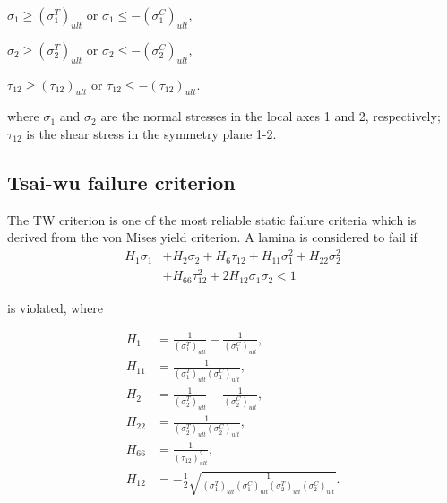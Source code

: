 $\sigma_1 \geq (\sigma _1^{T})_{ult} $ or $\sigma_1 \leq -(\sigma _1^{C})_{ult}
$,

$\sigma_2 \geq (\sigma _2^{T})_{ult} $ or $\sigma_2 \leq -(\sigma _2^{C})_{ult}
$,

$\tau_{12} \geq (\tau_{12})_{ult} $  or $\tau_{12} \leq -(\tau_{12})_{ult} $.

where $\sigma_1$ and $\sigma_2$ are the normal stresses in the local axes 1 and 2, respectively;
$\tau_{12}$ is the shear stress in the symmetry plane 1-2.

\subsection{Tsai-wu failure criterion}
The TW criterion is one of the most reliable static failure criteria which is derived from the von
Mises yield criterion.  
A lamina is considered to fail
if \begin{equation} \label{eq:tsai_wu}
\begin{split}
	H_1 \sigma_1  & + H_2 \sigma_2 + H_6 \tau_{12} + H_{11}\sigma_1^2 + H_{22} \sigma_2^2 \\
				  & + H_{66}  \tau_{12}^2 + 2H_{12}\sigma_1\sigma_2 < 1
\end{split}
\end{equation}

is violated, where

\begin{equation}
	\begin{split}
		H_{1}&=\frac{1}{\left(\sigma_{1}^{T}\right)_{u l
		t}}-\frac{1}{\left(\sigma_{1}^{C}\right)_{u l t}} \textstyle{,} \\
		H_{11}&=\frac{1}{\left(\sigma_{1}^{T}\right)_{u l t}\left(\sigma_{1}^{C}\right)_{u l t}} \textstyle{,}\\
		H_{2}&=\frac{1}{\left(\sigma_{2}^{T}\right)_{u l t}}-\frac{1}{\left(\sigma_{2}^{C}\right)_{u l t}} \textstyle{,}\\
		H_{22}&=\frac{1}{\left(\sigma_{2}^{T}\right)_{u l t}\left(\sigma_{2}^{C}\right)_{u l t}} \textstyle{,}\\
		H_{66}&=\frac{1}{\left(\tau_{12}\right)_{u l t}^{2}} \textstyle{,}\\
		H_{12}&=-\frac{1}{2} \sqrt{\frac{1}{\left(\sigma_{1}^{T}\right)_{u l
		t}\left(\sigma_{1}^{C}\right)_{u l t}\left(\sigma_{2}^{T}\right)_{u l
		t}\left(\sigma_{2}^{C}\right)_{u l t}}}\textstyle{.}
	\end{split}
\end{equation}

